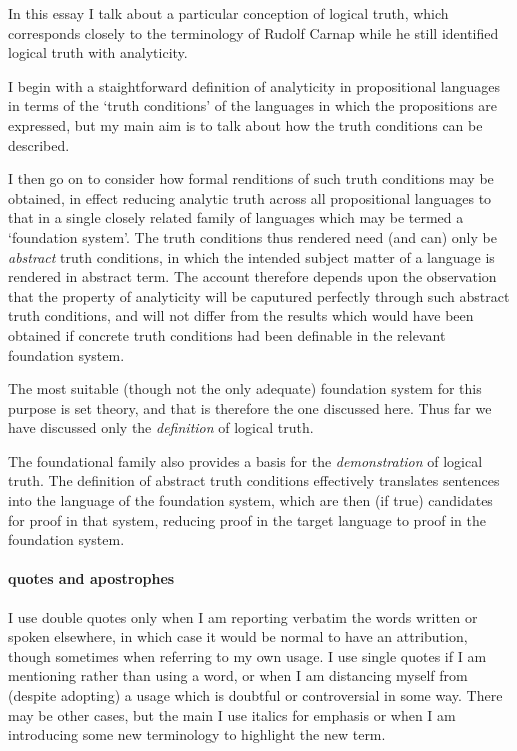 \documentclass[10pt,titlepage]{book}
\begin{document}
In this essay I talk about a particular conception of logical truth, which corresponds closely to the terminology of Rudolf Carnap while he still identified logical truth with analyticity.

I begin with a staightforward definition of analyticity in propositional languages in terms of the `truth conditions' of the languages in which the propositions are expressed, but my main aim is to talk about how the truth conditions can be described.

I then go on to consider how formal renditions of such truth conditions may be obtained, in effect reducing analytic truth across all propositional languages to that in a single closely related family of languages which may be termed a `foundation system'.
The truth conditions thus rendered need (and can) only be \emph{abstract} truth conditions, in which the intended subject matter of a language is rendered in abstract term.
The account therefore depends upon the observation that the property of analyticity will be caputured perfectly through such abstract truth conditions, and will not differ from the results which would have been obtained if concrete truth conditions had been definable in the relevant foundation system.

The most suitable (though not the only adequate) foundation system for this purpose is set theory, and that is therefore the one discussed here.
Thus far we have discussed only the \emph{definition} of logical truth.

The foundational family also provides a basis for the \emph{demonstration} of logical truth.
The definition of abstract truth conditions effectively translates sentences into the language of the foundation system, which are then (if true) candidates for proof in that system, reducing proof in the target language to proof in the foundation system.

\paragraph{quotes and apostrophes}

I use double quotes only when I am reporting verbatim the words written or spoken elsewhere, in which case it would be normal to have an attribution, though sometimes when referring to my own usage.
I use single quotes if I am mentioning rather than using a word, or when I am distancing myself from (despite adopting) a usage which is doubtful or controversial in some way.
There may be other cases, but the main
I use italics for emphasis or when I am introducing some new terminology to highlight the new term.
\end{document}
